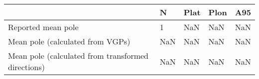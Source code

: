 \begin{tabular}{lllll}
\toprule
{} &    N & Plat & Plon &  A95 \\
\midrule
Reported mean pole                                 &    1 &  NaN &  NaN &  NaN \\
Mean pole (calculated from VGPs)                   &  NaN &  NaN &  NaN &  NaN \\
Mean pole (calculated from transformed directions) &  NaN &  NaN &  NaN &  NaN \\
\bottomrule
\end{tabular}
